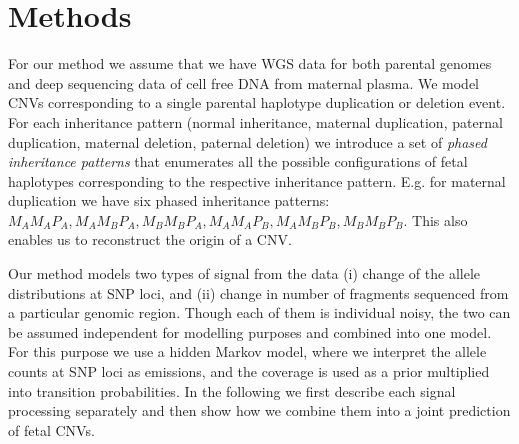 \section{Methods}
For our method we assume that we have WGS data for both parental genomes and deep sequencing data of cell free DNA from maternal plasma. We model CNVs corresponding to a single parental haplotype duplication or deletion event. For each inheritance pattern (normal inheritance, maternal duplication, paternal duplication, maternal deletion, paternal deletion) we introduce a set of \emph{phased inheritance patterns} that enumerates all the possible configurations of fetal haplotypes corresponding to the respective inheritance pattern. E.g. for maternal duplication we have six phased inheritance patterns: $M_AM_AP_A, M_AM_BP_A, M_BM_BP_A, M_AM_AP_B, M_AM_BP_B, M_BM_BP_B$. This also enables us to reconstruct the origin of a CNV.

Our method models two types of signal from the data (i) change of the allele distributions at SNP loci, and (ii) change in number of fragments sequenced from a particular genomic region. Though each of them is individual noisy, the two can be assumed independent for modelling purposes and combined into one model. For this purpose we use a hidden Markov model, where we interpret the allele counts at SNP loci as emissions, and the coverage is used as a prior multiplied into transition probabilities. In the following we first describe each signal processing separately and then show how we combine them into a joint prediction of fetal CNVs.

